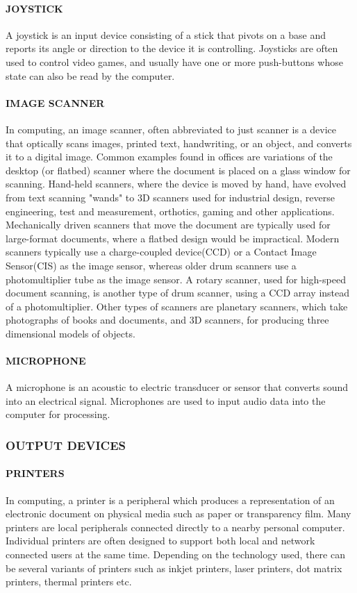 \documentclass[a4paper,28pt]{report}
\begin{document}
	\paragraph{JOYSTICK}
	 A joystick is an input device consisting of a stick that pivots on a base and reports its angle or
	direction to the device it is controlling. Joysticks are often used to control video games, and usually
	have one or more push-buttons whose state can also be read by the computer.
	\paragraph{IMAGE SCANNER}
	 In computing, an image scanner, often abbreviated to just scanner is a device that
	optically scans images, printed text, handwriting, or an object, and converts it to a digital image.
	Common examples found in offices are variations of the desktop (or flatbed) scanner where the
	document is placed on a glass window for scanning. Hand-held scanners, where the device is moved by
		hand, have evolved from text scanning "wands" to 3D scanners used for industrial design, reverse
	engineering, test and measurement, orthotics, gaming and other applications. Mechanically driven
	scanners that move the document are typically used for large-format documents, where a flatbed design
	would be impractical. Modern scanners typically use a charge-coupled device(CCD) or a Contact
	Image Sensor(CIS) as the image sensor, whereas older drum scanners use a photomultiplier tube as the
	image sensor. A rotary scanner, used for high-speed document scanning, is another type of drum
	scanner, using a CCD array instead of a photomultiplier. Other types of scanners are planetary
	scanners, which take photographs of books and documents, and 3D scanners, for producing three dimensional
	models of objects.
	\paragraph{MICROPHONE} 
	A microphone is an acoustic to electric transducer or sensor that converts sound into an
	electrical signal. Microphones are used to input audio data into the computer for processing.
\subsubsection*{OUTPUT DEVICES}
		\paragraph{PRINTERS}
	 In computing, a printer is a peripheral which produces a representation of an electronic
	document on physical media such as paper or transparency film. Many printers are local peripherals
	connected directly to a nearby personal computer. Individual printers are often designed to support both
	local and network connected users at the same time. Depending on the technology used, there can be
	several variants of printers such as inkjet printers, laser printers, dot matrix printers, thermal printers
	etc.
\end{document}
